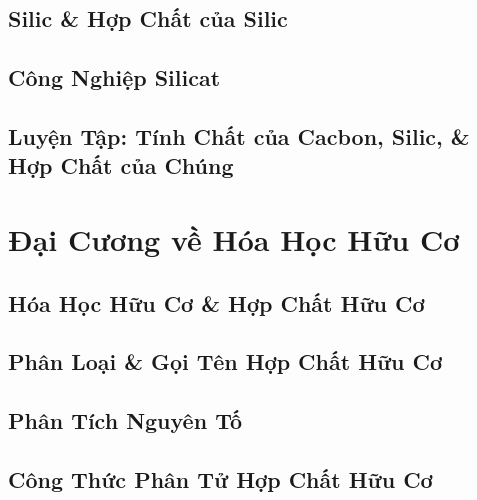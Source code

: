 \documentclass[oneside]{book}
\numberwithin{equation}{section}
\begin{document}

\section{Silic \& Hợp Chất của Silic}


\section{Công Nghiệp Silicat}


\section{Luyện Tập: Tính Chất của Cacbon, Silic, \& Hợp Chất của Chúng}


\chapter{Đại Cương về Hóa Học Hữu Cơ}

\section{Hóa Học Hữu Cơ \& Hợp Chất Hữu Cơ}


\section{Phân Loại \& Gọi Tên Hợp Chất Hữu Cơ}


\section{Phân Tích Nguyên Tố}


\section{Công Thức Phân Tử Hợp Chất Hữu Cơ}
\end{document}
